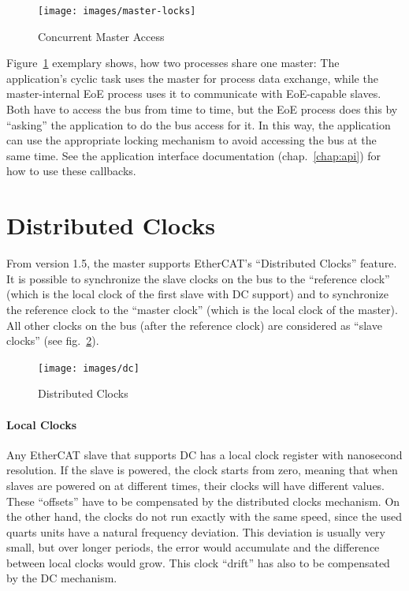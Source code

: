 \documentclass[a4paper,12pt,BCOR6mm,bibtotoc,idxtotoc]{scrbook}
\begin{document}
\begin{figure}[htbp]
  \centering
  \texttt{[image: images/master-locks]}
  \caption{Concurrent Master Access}
  \label{fig:locks}
\end{figure}

Figure~\ref{fig:locks} exemplary shows, how two processes share one master:
The application's cyclic task uses the master for process data exchange, while
the master-internal EoE process uses it to communicate with EoE-capable
slaves. Both have to access the bus from time to time, but the EoE process
does this by ``asking'' the application to do the bus access for it. In this
way, the application can use the appropriate locking mechanism to avoid
accessing the bus at the same time. See the application interface
documentation (chap.~\ref{chap:api}) for how to use these callbacks.


\section{Distributed Clocks}
\label{sec:dc}

From version 1.5, the master supports EtherCAT's ``Distributed Clocks''
feature. It is possible to synchronize the slave clocks on the bus to the
``reference clock'' (which is the local clock of the first slave with DC
support) and to synchronize the reference clock to the ``master clock'' (which
is the local clock of the master). All other clocks on the bus (after the
reference clock) are considered as ``slave clocks'' (see fig.~\ref{fig:dc}).

\begin{figure}[htbp]
  \centering
  \texttt{[image: images/dc]}
  \caption{Distributed Clocks}
  \label{fig:dc}
\end{figure}

\paragraph{Local Clocks} Any EtherCAT slave that supports DC has a local clock
register with nanosecond resolution. If the slave is powered, the clock starts
from zero, meaning that when slaves are powered on at different times, their
clocks will have different values. These ``offsets'' have to be compensated by
the distributed clocks mechanism. On the other hand, the clocks do not run
exactly with the same speed, since the used quarts units have a natural
frequency deviation. This deviation is usually very small, but over longer
periods, the error would accumulate and the difference between local clocks
would grow. This clock ``drift'' has also to be compensated by the DC
mechanism.
\end{document}
